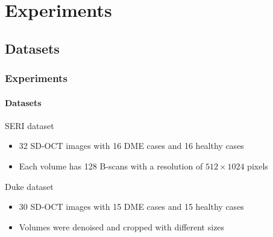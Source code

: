 \documentclass{beamer}
\begin{document}
\section{Experiments}

\subsection{Datasets}

\begin{frame}
  \frametitle{Experiments}
  \framesubtitle{Datasets}
  \begin{block}{SERI dataset}\footnotesize
    \begin{itemize}
      \item 32 SD-OCT images with 16 DME cases and 16 healthy cases
      \item Each volume has 128 B-scans with a resolution of $512 \times 1024$ pixels
    \end{itemize}
  \end{block}
  \begin{block}{Duke dataset}
    \begin{itemize}\footnotesize
      \item 30 SD-OCT images with 15 DME cases and 15 healthy cases
      \item Volumes were denoised and cropped with different sizes
    \end{itemize}
  \end{block}
\end{frame}


%   
%   



\end{document}

